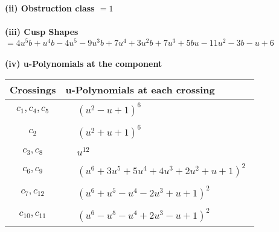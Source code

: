 \documentclass[1p]{elsarticle_modified}
\theoremstyle{definition}
\begin{document}
\flushleft \textbf{(ii) Obstruction class $= 1$}\\~\\
\flushleft \textbf{(iii) Cusp Shapes $= 4 u^5 b+u^4 b-4 u^5-9 u^3 b+7 u^4+3 u^2 b+7 u^3+5 b u-11 u^2-3 b- u+6$}\\~\\
\newpage\renewcommand{\arraystretch}{1}
\flushleft \textbf{(iv) u-Polynomials at the component}\newline \\
\begin{tabular}{m{50pt}|m{274pt}}
Crossings & \hspace{64pt}u-Polynomials at each crossing \\
\hline $$\begin{aligned}c_{1},c_{4},c_{5}\end{aligned}$$&$\begin{aligned}
&(u^2- u+1)^6
\end{aligned}$\\
\hline $$\begin{aligned}c_{2}\end{aligned}$$&$\begin{aligned}
&(u^2+u+1)^6
\end{aligned}$\\
\hline $$\begin{aligned}c_{3},c_{8}\end{aligned}$$&$\begin{aligned}
&u^{12}
\end{aligned}$\\
\hline $$\begin{aligned}c_{6},c_{9}\end{aligned}$$&$\begin{aligned}
&(u^6+3 u^5+5 u^4+4 u^3+2 u^2+u+1)^2
\end{aligned}$\\
\hline $$\begin{aligned}c_{7},c_{12}\end{aligned}$$&$\begin{aligned}
&(u^6+u^5- u^4-2 u^3+u+1)^2
\end{aligned}$\\
\hline $$\begin{aligned}c_{10},c_{11}\end{aligned}$$&$\begin{aligned}
&(u^6- u^5- u^4+2 u^3- u+1)^2
\end{aligned}$\\
\hline
\end{tabular}\\~\\
\end{document}
